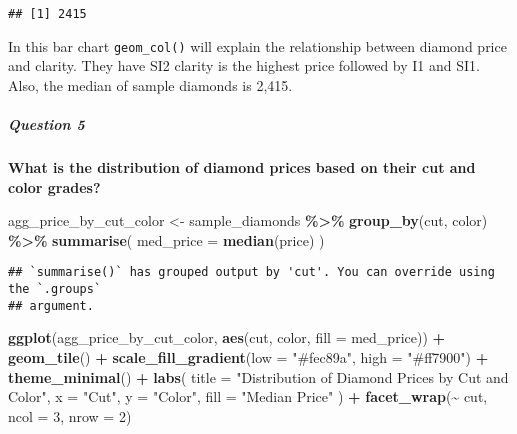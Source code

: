 \documentclass[
]{article}
\newenvironment{Shaded}{\begin{snugshade}}{\end{snugshade}}
\newcommand{\AttributeTok}[1]{\textcolor[rgb]{0.13,0.29,0.53}{#1}}
\newcommand{\DecValTok}[1]{\textcolor[rgb]{0.00,0.00,0.81}{#1}}
\newcommand{\FunctionTok}[1]{\textcolor[rgb]{0.13,0.29,0.53}{\textbf{#1}}}
\newcommand{\NormalTok}[1]{#1}
\newcommand{\OtherTok}[1]{\textcolor[rgb]{0.56,0.35,0.01}{#1}}
\newcommand{\SpecialCharTok}[1]{\textcolor[rgb]{0.81,0.36,0.00}{\textbf{#1}}}
\newcommand{\StringTok}[1]{\textcolor[rgb]{0.31,0.60,0.02}{#1}}
\begin{document}
\begin{verbatim}
## [1] 2415
\end{verbatim}

In this bar chart \texttt{geom\_col()} will explain the relationship
between diamond price and clarity. They have SI2 clarity is the highest
price followed by I1 and SI1. Also, the median of sample diamonds is
2,415.

\hypertarget{question-5}{%
\subparagraph{\texorpdfstring{\textbf{Question
5}}{Question 5}}\label{question-5}}

\textbf{What is the distribution of diamond prices based on their cut
and color grades?}

\begin{Shaded}
\begin{Highlighting}[]
\NormalTok{agg\_price\_by\_cut\_color }\OtherTok{\textless{}{-}}\NormalTok{ sample\_diamonds }\SpecialCharTok{\%\textgreater{}\%}
  \FunctionTok{group\_by}\NormalTok{(cut, color) }\SpecialCharTok{\%\textgreater{}\%}
  \FunctionTok{summarise}\NormalTok{(}
    \AttributeTok{med\_price =} \FunctionTok{median}\NormalTok{(price)}
\NormalTok{  )}
\end{Highlighting}
\end{Shaded}

\begin{verbatim}
## `summarise()` has grouped output by 'cut'. You can override using the `.groups`
## argument.
\end{verbatim}

\begin{Shaded}
\begin{Highlighting}[]
\FunctionTok{ggplot}\NormalTok{(agg\_price\_by\_cut\_color, }\FunctionTok{aes}\NormalTok{(cut, color, }\AttributeTok{fill =}\NormalTok{ med\_price)) }\SpecialCharTok{+}
  \FunctionTok{geom\_tile}\NormalTok{() }\SpecialCharTok{+}
  \FunctionTok{scale\_fill\_gradient}\NormalTok{(}\AttributeTok{low =} \StringTok{"\#fec89a"}\NormalTok{, }\AttributeTok{high =} \StringTok{"\#ff7900"}\NormalTok{) }\SpecialCharTok{+}
  \FunctionTok{theme\_minimal}\NormalTok{() }\SpecialCharTok{+}
  \FunctionTok{labs}\NormalTok{(}
    \AttributeTok{title =} \StringTok{"Distribution of Diamond Prices by Cut and Color"}\NormalTok{,}
    \AttributeTok{x =} \StringTok{"Cut"}\NormalTok{,}
    \AttributeTok{y =} \StringTok{"Color"}\NormalTok{,}
    \AttributeTok{fill =} \StringTok{"Median Price"}
\NormalTok{  ) }\SpecialCharTok{+}
  \FunctionTok{facet\_wrap}\NormalTok{(}\SpecialCharTok{\textasciitilde{}}\NormalTok{ cut, }\AttributeTok{ncol =} \DecValTok{3}\NormalTok{, }\AttributeTok{nrow =} \DecValTok{2}\NormalTok{)}
\end{Highlighting}
\end{Shaded}
\end{document}
